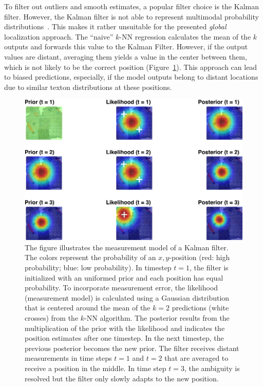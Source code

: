 \documentclass[11pt]{report}
\begin{document}
To filter out outliers and smooth estimates, a popular filter choice
is the Kalman filter. However, the Kalman filter is not able to
represent multimodal probability
distributions~\cite{dellaert1999monte}. This makes it rather
unsuitable for the presented \emph{global} localization approach. The
``naive'' $k$-NN regression calculates the mean of the $k$ outputs and
forwards this value to the Kalman Filter. However, if the output
values are distant, averaging them yields a value in the center
between them, which is not likely to be the correct position
(Figure~\ref{fig:kali}). This approach can lead to biased predictions,
especially, if the model outputs belong to distant locations due to
similar texton distributions at these positions.

\begin{figure}[h]
\begin{center}
\includegraphics[width=0.8\columnwidth]{kalman-crop}
\caption[Kalman Filter.]{{\label{fig:kali} The figure illustrates the
    measurement model of a Kalman filter.  The colors represent the
    probability of an $x,y$-position (red: high probability; blue: low
    probability). In timestep $t = 1$, the filter is initialized with
    an uniformed prior and each position has equal probability.  To
    incorporate measurement error, the likelihood (measurement model)
    is calculated using a Gaussian distribution that is centered
    around the mean of the $k = 2$ predictions (white crosses) from
    the $k$-NN algorithm. The posterior results from the
    multiplication of the prior with the likelihood and indicates the
    position estimates after one timestep. In the next timestep, the
    previous posterior
    becomes the new prior.
    The filter receives distant measurements in time steps $t = 1$ and
    $t = 2$ that are averaged to receive a position in the middle. In
    time step $t = 3$, the ambiguity is resolved but the filter only
    slowly adapts to the new position.}}
\end{center}
\end{figure}
\end{document}
